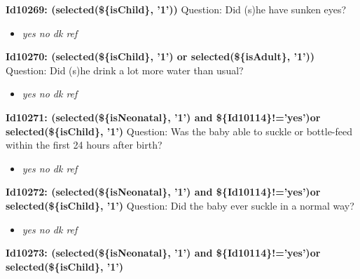 \documentclass{article}%
\begin{document}
\textbf{Id10269: (selected(\$\{isChild\}, '1'))\newline%
}%
Question: Did (s)he have sunken eyes?\newline%
%
\begin{itemize}%
\item%
\textit{yes\newline%
 no\newline%
 dk\newline%
 ref\newline%
}%
\end{itemize}%
\textbf{Id10270: (selected(\$\{isChild\}, '1') or selected(\$\{isAdult\}, '1'))\newline%
}%
Question: Did (s)he drink a lot more water than usual?\newline%
%
\begin{itemize}%
\item%
\textit{yes\newline%
 no\newline%
 dk\newline%
 ref\newline%
}%
\end{itemize}%
\textbf{Id10271: (selected(\$\{isNeonatal\}, '1') and \$\{Id10114\}!='yes')or selected(\$\{isChild\}, '1')\newline%
}%
Question: Was the baby able to suckle or bottle{-}feed within the first 24 hours after birth?\newline%
%
\begin{itemize}%
\item%
\textit{yes\newline%
 no\newline%
 dk\newline%
 ref\newline%
}%
\end{itemize}%
\textbf{Id10272: (selected(\$\{isNeonatal\}, '1') and \$\{Id10114\}!='yes')or selected(\$\{isChild\}, '1')\newline%
}%
Question: Did the baby ever suckle in a normal way?\newline%
%
\begin{itemize}%
\item%
\textit{yes\newline%
 no\newline%
 dk\newline%
 ref\newline%
}%
\end{itemize}%
\textbf{Id10273: (selected(\$\{isNeonatal\}, '1') and \$\{Id10114\}!='yes')or selected(\$\{isChild\}, '1')\newline%
}%
\end{document}
